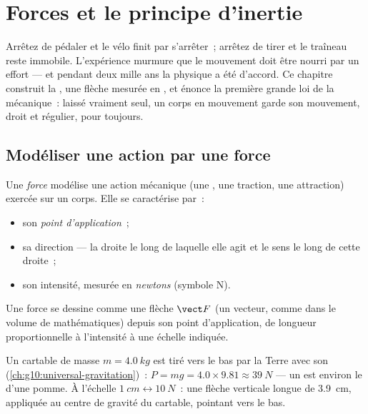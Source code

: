 \chapter{Forces et le principe d'inertie}\label{ch:g10:inertia}

Arrêtez de pédaler et le vélo finit par s'arrêter~; arrêtez de tirer et
le traîneau reste immobile. L'expérience murmure que le mouvement doit
être nourri par un effort --- et pendant deux mille ans la physique a
été d'accord. Ce chapitre construit la , une flèche mesurée en
, et énonce la première grande loi de la mécanique~: laissé
vraiment seul, un corps en mouvement garde son mouvement, droit et
régulier, pour toujours.

\section{Modéliser une action par une force}

\begin{definition}[Force]\label{def:g10:inertia:force}
Une \emph{force} modélise une action mécanique (une
, une traction, une attraction) exercée sur un corps. Elle se
caractérise par~:
\begin{itemize}
  \item son \emph{point d'application}~;
  \item sa direction --- la droite le long de laquelle elle agit et le
        sens le long de cette droite~;
  \item son intensité, mesurée en \emph{newtons}
        (symbole \unit{N}).
\end{itemize}
Une force se dessine comme une flèche $\vect F$ (un vecteur, comme dans
le volume de mathématiques) depuis son point d'application, de longueur
proportionnelle à l'intensité à une échelle indiquée.
\end{definition}

\begin{example}\label{ex:g10:inertia:schoolbag}
Un cartable de masse $m = \qty{4.0}{kg}$ est tiré vers le bas par la
Terre avec son 
(\cref{ch:g10:universal-gravitation})~:
$P = mg = 4.0 \times 9.81 \approx \qty{39}{N}$ --- un 
est environ le  d'une pomme. À l'échelle
$\qty{1}{cm} \leftrightarrow \qty{10}{N}$~: une flèche verticale longue
de \qty{3.9}{cm}, appliquée au centre de gravité du cartable, pointant
vers le bas.
\end{example}

